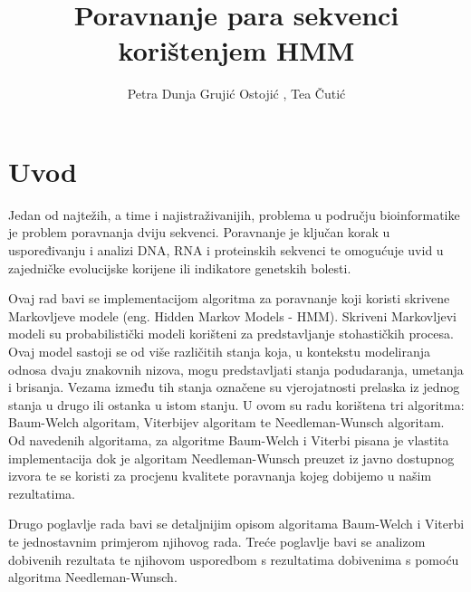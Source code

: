 \documentclass[times, utf8, seminar, numeric]{fer}
\begin{document}
\title{Poravnanje para sekvenci korištenjem HMM}

\author{Petra Dunja Grujić Ostojić , Tea Čutić}


\maketitle

\tableofcontents

\chapter{Uvod}
Jedan od najtežih, a time i najistraživanijih, problema u području bioinformatike je problem poravnanja dviju sekvenci. Poravnanje je ključan korak u uspoređivanju i analizi DNA, RNA i proteinskih sekvenci te omogućuje uvid u zajedničke evolucijske korijene ili indikatore genetskih bolesti.

\bigskip

Ovaj rad bavi se implementacijom algoritma za poravnanje koji koristi skrivene  Markovljeve modele (eng. Hidden Markov Models - HMM). Skriveni Markovljevi modeli su probabilistički modeli korišteni za predstavljanje stohastičkih procesa. Ovaj model sastoji se od više različitih stanja koja, u kontekstu modeliranja odnosa dvaju znakovnih nizova, mogu predstavljati stanja podudaranja, umetanja i brisanja. Vezama između tih stanja označene su vjerojatnosti prelaska iz jednog stanja u drugo ili ostanka u istom stanju. U ovom su radu korištena tri algoritma: Baum-Welch algoritam, Viterbijev algoritam te Needleman-Wunsch algoritam. Od navedenih algoritama, za algoritme Baum-Welch i Viterbi pisana je vlastita implementacija dok je algoritam Needleman-Wunsch preuzet iz javno dostupnog izvora te se koristi za procjenu kvalitete poravnanja kojeg dobijemo u našim rezultatima.

\bigskip

Drugo poglavlje rada bavi se detaljnijim opisom algoritama Baum-Welch i Viterbi te jednostavnim primjerom njihovog rada. Treće poglavlje bavi se analizom dobivenih rezultata te njihovom usporedbom s rezultatima dobivenima s pomoću algoritma Needleman-Wunsch.
\end{document}
